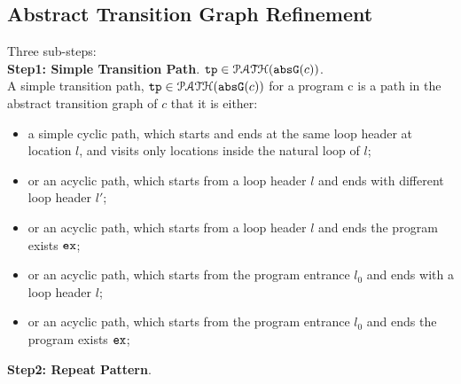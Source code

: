 \subsection{Abstract Transition Graph Refinement}
\label{sec:refine}
Three sub-steps:
\\
\textbf{Step1: Simple Transition Path}. $\mathtt{tp} \in \mathcal{PATH}(\mathtt{abs}{\mathtt{G}}(c))$.
\\
A simple transition path, $\mathtt{tp} \in \mathcal{PATH}(\mathtt{abs}{\mathtt{G}}(c))$ for a program c is a path in the abstract transition graph of $c$ that it is either:
\begin{itemize}
  \item a simple cyclic path, which starts and ends at the same loop header at location $l$, 
  and visits only locations inside the natural loop of $l$;
  \item or an acyclic path, which starts from a loop header $l$ 
and ends with different loop header $l'$;
\item or an acyclic path, which starts from a loop header $l$ 
and ends the program exists $\mathtt{ex}$;
\item or an acyclic path, which starts from the program entrance $l_0$
and ends with a loop header $l$;
\item or an acyclic path, which starts from the program entrance $l_0$
and ends the program exists $\mathtt{ex}$;
\end{itemize}
%
\textbf{Step2: Repeat Pattern}.
\\
